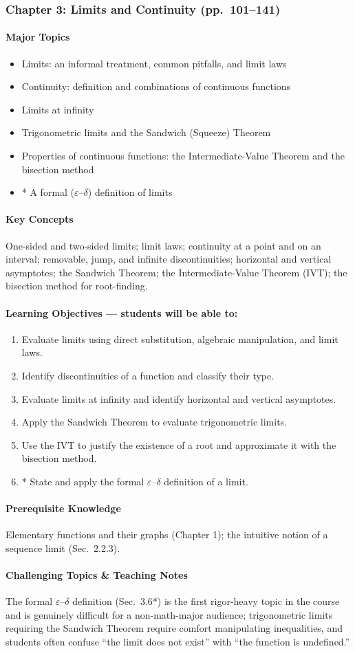 \documentclass[11pt]{article}
\newcommand{\ChapHead}[2]{\subsubsection{#1 \textnormal{\normalfont\normalsize\color{lightgray}(pp.\ #2)}}}
\newcommand{\MajorTopics}{\paragraph{Major Topics}}
\newcommand{\KeyConcepts}{\paragraph{Key Concepts}}
\newcommand{\LearnObj}{\paragraph{Learning Objectives --- students will be able to:}}
\newcommand{\PreReq}{\paragraph{Prerequisite Knowledge}}
\newcommand{\Hard}{\paragraph{Challenging Topics \& Teaching Notes}}
\begin{document}
\ChapHead{Chapter 3: Limits and Continuity}{101--141}

\MajorTopics
\begin{itemize}
\item Limits: an informal treatment, common pitfalls, and limit laws
\item Continuity: definition and combinations of continuous functions
\item Limits at infinity
\item Trigonometric limits and the Sandwich (Squeeze) Theorem
\item Properties of continuous functions: the Intermediate-Value Theorem and the bisection method
\item * A formal ($\varepsilon$--$\delta$) definition of limits
\end{itemize}

\KeyConcepts
One-sided and two-sided limits; limit laws; continuity at a point and on an
interval; removable, jump, and infinite discontinuities; horizontal and
vertical asymptotes; the Sandwich Theorem; the Intermediate-Value Theorem
(IVT); the bisection method for root-finding.

\LearnObj
\begin{enumerate}
\item Evaluate limits using direct substitution, algebraic manipulation, and limit laws.
\item Identify discontinuities of a function and classify their type.
\item Evaluate limits at infinity and identify horizontal and vertical asymptotes.
\item Apply the Sandwich Theorem to evaluate trigonometric limits.
\item Use the IVT to justify the existence of a root and approximate it with the bisection method.
\item * State and apply the formal $\varepsilon$--$\delta$ definition of a limit.
\end{enumerate}

\PreReq Elementary functions and their graphs (Chapter 1); the intuitive notion of a sequence limit (Sec.\ 2.2.3).

\Hard The formal $\varepsilon$--$\delta$ definition (Sec.\ 3.6*) is the
first rigor-heavy topic in the course and is genuinely difficult for a
non-math-major audience; trigonometric limits requiring the Sandwich
Theorem require comfort manipulating inequalities, and students often
confuse ``the limit does not exist'' with ``the function is undefined.''
\end{document}

